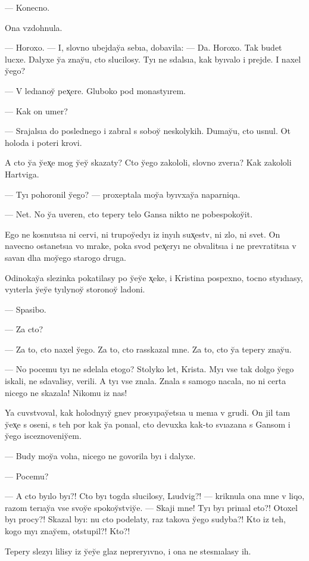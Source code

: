 \documentclass[10pt]{book}
\begin{document}
— Konecno.

Ona vzdohnula.

— Horoxo. — I, slovno ubejday̆a sebıa, dobavila: — Da. Horoxo. Tak budet lucxe. Dalyxe y̆a znay̆u, cto slucilosy. Tyı ne sdalsıa, kak byıvalo i prejde. I naxel y̆ego?

— V ledıanoy̆ pex̨ere. Gluboko pod monastyırem.

— Kak on umer?

— Srajalsıa do poslednego i zabral s soboy̆ neskolykih. Dumay̆u, cto usnul. Ot holoda i poteri krovi.

A cto y̆a y̆ex̨e mog y̆ey̆ skazaty? Cto y̆ego zakololi, slovno zverıa? Kak zakololi Hartviga.

— Tyı pohoronil y̆ego? — proxeptala moy̆a byıvxay̆a naparniqa.

— Net. No y̆a uveren, cto tepery telo Gansa nikto ne pobespokoy̆it.

Ego ne kosnutsıa ni cervi, ni trupoy̆edyı iz inyıh sux̨estv, ni zlo, ni svet. On navecno ostanetsıa vo mrake, poka svod pex̨eryı ne obvalitsıa i ne prevratitsıa v savan dlıa moy̆ego starogo druga.

Odinokay̆a slezinka pokatilasy po y̆ey̆e x̨eke, i Kristina pospexno, tocno styıdıasy, vyıterla y̆ey̆e tyılynoy̆ storonoy̆ ladoni.

— Spasibo.

— Za cto?

— Za to, cto naxel y̆ego. Za to, cto rasskazal mne. Za to, cto y̆a tepery znay̆u.

— No pocemu tyı ne sdelala etogo? Stolyko let, Krista. Myı vse tak dolgo y̆ego iskali, ne sdavalisy, verili. A tyı vse znala. Znala s samogo nacala, no ni certa nicego ne skazala! Nikomu iz nas!

Ya cuvstvoval, kak holodnyıy̆ gnev prosyıpay̆etsıa u menıa v grudi. On jil tam y̆ex̨e s oseni, s teh por kak y̆a ponıal, cto devuxka kak-to svıazana s Gansom i y̆ego isceznoveniy̆em.

— Budy moy̆a volıa, nicego ne govorila byı i dalyxe.

— Pocemu?

— A cto byılo byı?! Cto byı togda slucilosy, Lıudvig?! — kriknula ona mne v liqo, razom terıay̆a vse svoy̆e spokoy̆stviy̆e. — Skaji mne! Tyı byı prinıal eto?! Otoxel byı procy?! Skazal byı: nu cto podelaty, raz takova y̆ego sudyba?! Kto iz teh, kogo myı znay̆em, otstupil?! Kto?!

Tepery slezyı lilisy iz y̆ey̆e glaz nepreryıvno, i ona ne stesnıalasy ih.
\end{document}
